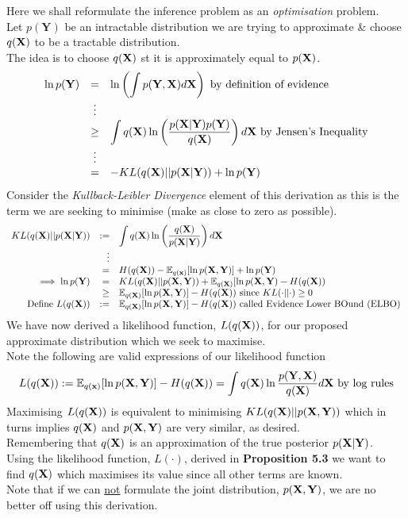 \documentclass[11pt,a4paper]{article}
\begin{document}
Here we shall reformulate the inference problem as an \textit{optimisation} problem.\\
Let $p(\textbf{Y})$ be an intractable distribution we are trying to approximate \& choose $q(\textbf{X})$ to be a tractable distribution.\\
The idea is to choose $q(\textbf{X})$ st it is approximately equal to $p(\textbf{X})$.
\[\begin{array}{rcl}
\ln p(\textbf{Y})&=&\ln\left(\displaystyle\int p(\textbf{Y},\textbf{X})d\textbf{X}\right)\text{ by definition of evidence}\\
&\vdots&\\
&\geq&\displaystyle\int q(\textbf{X})\ln\left(\dfrac{p(\textbf{X}|\textbf{Y})p(\textbf{Y})}{q(\textbf{X})}\right)d\textbf{X}\text{ by Jensen's Inequality}\\
&\vdots&\\
&=&-KL(q(\textbf{X})||p(\textbf{X}|\textbf{Y}))+\ln p(\textbf{Y})
\end{array}\]
Consider the \textit{Kullback-Leibler Divergence} element of this derivation as this is the term we are seeking to minimise (\ie make as close to zero as possible).
\[\begin{array}{rrl}
KL(q(\textbf{X})||p(\textbf{X}|\textbf{Y}))&:=&\displaystyle\int q(\textbf{X})\ln\left(\dfrac{q(\textbf{X})}{p(\textbf{X}|\textbf{Y})}\right)d\textbf{X}\\
&\vdots&\\
&=&H(q(\textbf{X}))-\mathbb{E}_{q(\textbf{x})}[\ln p(\textbf{X},\textbf{Y})]+\ln p(\textbf{Y})\\
\implies\ln p(\textbf{Y})&=&KL(q(\textbf{X})||p(\textbf{X},\textbf{Y}))+\mathbb{E}_{q(\textbf{X})}[\ln p(\textbf{X},\textbf{Y})-H(q(\textbf{X}))\\
&\geq&\mathbb{E}_{q(\textbf{X})}[\ln p(\textbf{X},\textbf{Y})]-H(q(\textbf{X}))\text{ since }KL(\cdot||\cdot)\geq0\\
\text{Define }L(q(\textbf{X}))&:=&\mathbb{E}_{q(\textbf{X})}[\ln p(\textbf{X},\textbf{Y})]-H(q(\textbf{X}))\text{ called Evidence Lower BOund (ELBO)}
\end{array}\]
We have now derived a likelihood function, $L(q(\textbf{X}))$, for our proposed approximate distribution which we seek to maximise.\\
Note the following are valid expressions of our likelihood function
$$L(q(\textbf{X})):=\mathbb{E}_{q(\textbf{x})}[\ln p(\textbf{X},\textbf{Y})]-H(q(\textbf{X}))=\int q(\textbf{X})\ln\dfrac{p(\textbf{Y},\textbf{X})}{q(\textbf{X})}d\textbf{X}\text{ by log rules}$$
\nb Maximising $L(q(\textbf{X}))$ is equivalent to minimising $KL(q(\textbf{X})||p(\textbf{X},\textbf{Y}))$ which in turns implies $q(\textbf{X})$ and $p(\textbf{X},\textbf{Y})$ are very similar, as desired.\\

Remembering that $q(\textbf{X})$ is an approximation of the true posterior $p(\textbf{X}|\textbf{Y})$.\\
Using the likelihood function, $L(\cdot)$, derived in \textbf{Proposition 5.3} we want to find $q(\textbf{X})$ which maximises its value since all other terms are known.\\
Note that if we can \underline{not} formulate the joint distribution, $p(\textbf{X},\textbf{Y})$, we are no better off using this derivation.
\end{document}

